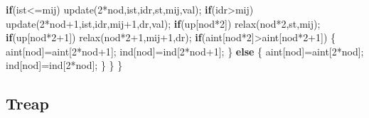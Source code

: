 \documentclass[10pt,]{article}
\newenvironment{Shaded}{}{}
\newcommand{\KeywordTok}[1]{\textcolor[rgb]{0.00,0.44,0.13}{\textbf{{#1}}}}
\newcommand{\DecValTok}[1]{\textcolor[rgb]{0.25,0.63,0.44}{{#1}}}
\newcommand{\NormalTok}[1]{{#1}}
\begin{document}
\begin{Shaded}
\begin{Highlighting}[]
    \KeywordTok{if}\NormalTok{(ist<=mij)}
      \NormalTok{update(}\DecValTok{2}\NormalTok{*nod,ist,idr,st,mij,val);}
    \KeywordTok{if}\NormalTok{(idr>mij)}
      \NormalTok{update(}\DecValTok{2}\NormalTok{*nod}\DecValTok{+1}\NormalTok{,ist,idr,mij}\DecValTok{+1}\NormalTok{,dr,val);}
    \KeywordTok{if}\NormalTok{(up[nod*}\DecValTok{2}\NormalTok{])}
      \NormalTok{relax(nod*}\DecValTok{2}\NormalTok{,st,mij);}
    \KeywordTok{if}\NormalTok{(up[nod*}\DecValTok{2+1}\NormalTok{])}
      \NormalTok{relax(nod*}\DecValTok{2+1}\NormalTok{,mij}\DecValTok{+1}\NormalTok{,dr);}
    \KeywordTok{if}\NormalTok{(aint[nod*}\DecValTok{2}\NormalTok{]>aint[nod*}\DecValTok{2+1}\NormalTok{]) \{}
      \NormalTok{aint[nod]=aint[}\DecValTok{2}\NormalTok{*nod}\DecValTok{+1}\NormalTok{];}
      \NormalTok{ind[nod]=ind[}\DecValTok{2}\NormalTok{*nod}\DecValTok{+1}\NormalTok{];}
    \NormalTok{\} }\KeywordTok{else} \NormalTok{\{}
      \NormalTok{aint[nod]=aint[}\DecValTok{2}\NormalTok{*nod];}
      \NormalTok{ind[nod]=ind[}\DecValTok{2}\NormalTok{*nod];}
    \NormalTok{\}}
  \NormalTok{\}}
\NormalTok{\}}
\end{Highlighting}
\end{Shaded}

\subsection{Treap}
\end{document}
